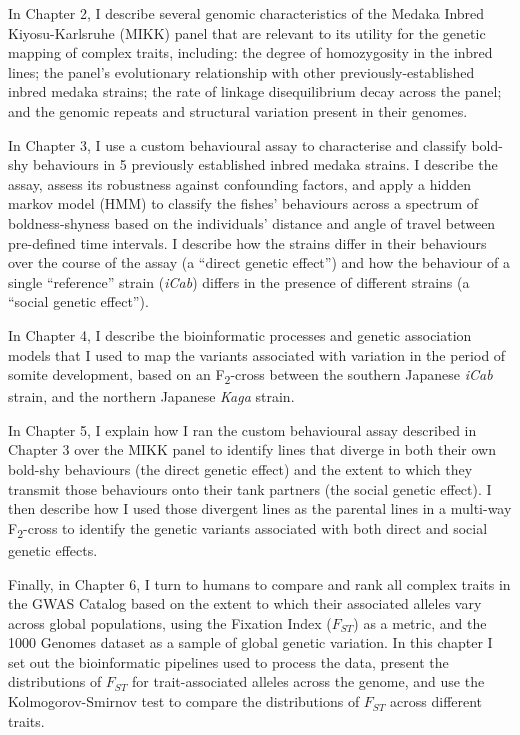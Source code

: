 \documentclass[
]{book}
\begin{document}
In Chapter 2, I describe several genomic characteristics of the Medaka Inbred Kiyosu-Karlsruhe (MIKK) panel that are relevant to its utility for the genetic mapping of complex traits, including: the degree of homozygosity in the inbred lines; the panel's evolutionary relationship with other previously-established inbred medaka strains; the rate of linkage disequilibrium decay across the panel; and the genomic repeats and structural variation present in their genomes.

In Chapter 3, I use a custom behavioural assay to characterise and classify bold-shy behaviours in 5 previously established inbred medaka strains. I describe the assay, assess its robustness against confounding factors, and apply a hidden markov model (HMM) to classify the fishes' behaviours across a spectrum of boldness-shyness based on the individuals' distance and angle of travel between pre-defined time intervals. I describe how the strains differ in their behaviours over the course of the assay (a ``direct genetic effect'') and how the behaviour of a single ``reference'' strain (\emph{iCab}) differs in the presence of different strains (a ``social genetic effect'').

In Chapter 4, I describe the bioinformatic processes and genetic association models that I used to map the variants associated with variation in the period of somite development, based on an F\textsubscript{2}-cross between the southern Japanese \emph{iCab} strain, and the northern Japanese \emph{Kaga} strain.

In Chapter 5, I explain how I ran the custom behavioural assay described in Chapter 3 over the MIKK panel to identify lines that diverge in both their own bold-shy behaviours (the direct genetic effect) and the extent to which they transmit those behaviours onto their tank partners (the social genetic effect). I then describe how I used those divergent lines as the parental lines in a multi-way F\textsubscript{2}-cross to identify the genetic variants associated with both direct and social genetic effects.

Finally, in Chapter 6, I turn to humans to compare and rank all complex traits in the GWAS Catalog based on the extent to which their associated alleles vary across global populations, using the Fixation Index (\(F_{ST}\)) as a metric, and the 1000 Genomes dataset as a sample of global genetic variation. In this chapter I set out the bioinformatic pipelines used to process the data, present the distributions of \(F_{ST}\) for trait-associated alleles across the genome, and use the Kolmogorov-Smirnov test to compare the distributions of \(F_{ST}\) across different traits.
\end{document}
